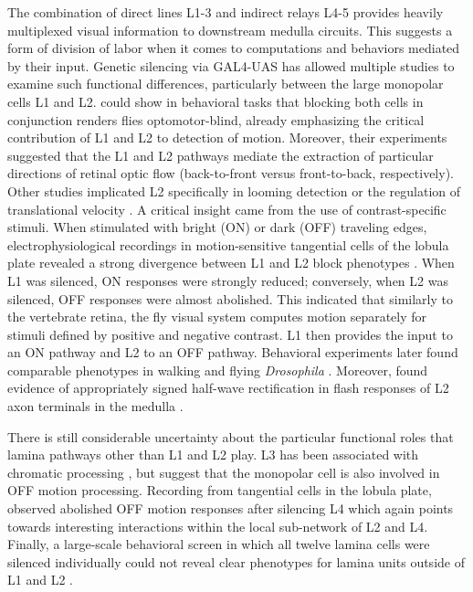The combination of direct lines L1-3 and indirect relays L4-5 provides heavily multiplexed visual information to downstream medulla circuits. This suggests a form of division of labor when it comes to computations and behaviors mediated by their input. Genetic silencing via GAL4-UAS has allowed multiple studies to examine such functional differences, particularly between the large monopolar cells L1 and L2. \citet{Rister:2007fn} could show in behavioral tasks that blocking both cells in conjunction renders flies optomotor-blind, already emphasizing the critical contribution of L1 and L2 to detection of motion. Moreover, their experiments suggested that the L1 and L2 pathways mediate the extraction of particular directions of retinal optic flow (back-to-front versus front-to-back, respectively). Other studies implicated L2 specifically in looming detection or the regulation of translational velocity \citep{deVries:2012aa,Katsov:2008iy}. A critical insight came from the use of contrast-specific stimuli. When stimulated with bright (ON) or dark (OFF) traveling edges, electrophysiological recordings in motion-sensitive tangential cells of the lobula plate revealed a strong divergence between L1 and L2 block phenotypes \citep{Joesch:2010fw}. When L1 was silenced, ON responses were strongly reduced; conversely, when L2 was silenced, OFF responses were almost abolished. This indicated that similarly to the vertebrate retina, the fly visual system computes motion separately for stimuli defined by positive and negative contrast. L1 then provides the input to an ON pathway and L2 to an OFF pathway. Behavioral experiments later found comparable phenotypes in walking and flying \textit{Drosophila} \citep{Clark:2011gw,Tuthill:2013jk}. Moreover, \citet{Reiff:2010eo} found evidence of appropriately signed half-wave rectification in flash responses of L2 axon terminals in the medulla \citep[which may differ in dynamic stimulus regimes, see][]{Clark:2011gw,Strother:2014aa}.

There is still considerable uncertainty about the particular functional roles that lamina pathways other than L1 and L2 play. L3 has been associated with chromatic processing \citep{Gao:2008ik}, but \citet{Silies:2013jp} suggest that the monopolar cell is also involved in OFF motion processing. Recording from tangential cells in the lobula plate, \citet{Meier:2014fr} observed abolished OFF motion responses after silencing L4 which again points towards interesting interactions within the local sub-network of L2 and L4. Finally, a large-scale behavioral screen in which all twelve lamina cells were silenced individually could not reveal clear phenotypes for lamina units outside of L1 and L2 \citep{Tuthill:2013jk,Tuthill:2014gc}.

